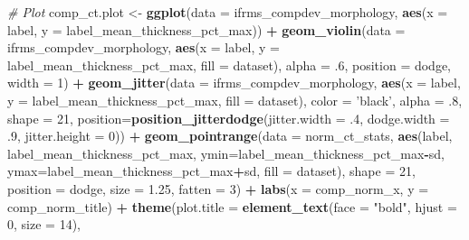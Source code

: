 \documentclass[
]{article}
\newenvironment{Shaded}{\begin{snugshade}}{\end{snugshade}}
\newcommand{\CommentTok}[1]{\textcolor[rgb]{0.56,0.35,0.01}{\textit{#1}}}
\newcommand{\DataTypeTok}[1]{\textcolor[rgb]{0.13,0.29,0.53}{#1}}
\newcommand{\DecValTok}[1]{\textcolor[rgb]{0.00,0.00,0.81}{#1}}
\newcommand{\FloatTok}[1]{\textcolor[rgb]{0.00,0.00,0.81}{#1}}
\newcommand{\KeywordTok}[1]{\textcolor[rgb]{0.13,0.29,0.53}{\textbf{#1}}}
\newcommand{\NormalTok}[1]{#1}
\newcommand{\OperatorTok}[1]{\textcolor[rgb]{0.81,0.36,0.00}{\textbf{#1}}}
\newcommand{\StringTok}[1]{\textcolor[rgb]{0.31,0.60,0.02}{#1}}
\begin{document}
\begin{Shaded}
\begin{Highlighting}[]
{\CommentTok{# Plot}
\NormalTok{comp_ct.plot <-}\StringTok{ }\KeywordTok{ggplot}\NormalTok{(}\DataTypeTok{data =}\NormalTok{ ifrms_compdev_morphology, }\KeywordTok{aes}\NormalTok{(}\DataTypeTok{x =}\NormalTok{ label, }\DataTypeTok{y =}\NormalTok{ label_mean_thickness_pct_max)) }\OperatorTok{+}
\StringTok{  }\KeywordTok{geom_violin}\NormalTok{(}\DataTypeTok{data =}\NormalTok{ ifrms_compdev_morphology, }
              \KeywordTok{aes}\NormalTok{(}\DataTypeTok{x =}\NormalTok{ label, }\DataTypeTok{y =}\NormalTok{ label_mean_thickness_pct_max, }\DataTypeTok{fill =}\NormalTok{ dataset), }
              \DataTypeTok{alpha =} \FloatTok{.6}\NormalTok{, }\DataTypeTok{position =}\NormalTok{ dodge, }\DataTypeTok{width =} \DecValTok{1}\NormalTok{) }\OperatorTok{+}\StringTok{ }
\StringTok{  }\KeywordTok{geom_jitter}\NormalTok{(}\DataTypeTok{data =}\NormalTok{ ifrms_compdev_morphology, }
              \KeywordTok{aes}\NormalTok{(}\DataTypeTok{x =}\NormalTok{ label, }\DataTypeTok{y =}\NormalTok{ label_mean_thickness_pct_max, }\DataTypeTok{fill =}\NormalTok{ dataset), }
              \DataTypeTok{color =} \StringTok{'black'}\NormalTok{, }\DataTypeTok{alpha =} \FloatTok{.8}\NormalTok{, }\DataTypeTok{shape =} \DecValTok{21}\NormalTok{,}
              \DataTypeTok{position=}\KeywordTok{position_jitterdodge}\NormalTok{(}\DataTypeTok{jitter.width =} \FloatTok{.4}\NormalTok{, }\DataTypeTok{dodge.width =} \FloatTok{.9}\NormalTok{, }\DataTypeTok{jitter.height =} \DecValTok{0}\NormalTok{)) }\OperatorTok{+}
\StringTok{  }\KeywordTok{geom_pointrange}\NormalTok{(}\DataTypeTok{data =}\NormalTok{ norm_ct_stats, }
                  \KeywordTok{aes}\NormalTok{(label, label_mean_thickness_pct_max, }
                      \DataTypeTok{ymin=}\NormalTok{label_mean_thickness_pct_max}\OperatorTok{-}\NormalTok{sd, }
                      \DataTypeTok{ymax=}\NormalTok{label_mean_thickness_pct_max}\OperatorTok{+}\NormalTok{sd, }\DataTypeTok{fill =}\NormalTok{ dataset), }
                  \DataTypeTok{shape =} \DecValTok{21}\NormalTok{, }\DataTypeTok{position =}\NormalTok{ dodge, }\DataTypeTok{size =} \FloatTok{1.25}\NormalTok{, }\DataTypeTok{fatten =} \DecValTok{3}\NormalTok{) }\OperatorTok{+}
\StringTok{  }\KeywordTok{labs}\NormalTok{(}\DataTypeTok{x =}\NormalTok{ comp_norm_x,}
       \DataTypeTok{y =}\NormalTok{ comp_norm_title) }\OperatorTok{+}\StringTok{ }
\StringTok{  }\KeywordTok{theme}\NormalTok{(}\DataTypeTok{plot.title =} \KeywordTok{element_text}\NormalTok{(}\DataTypeTok{face =} \StringTok{"bold"}\NormalTok{, }\DataTypeTok{hjust =} \DecValTok{0}\NormalTok{, }\DataTypeTok{size =} \DecValTok{14}\NormalTok{), }
}
\end{Highlighting}
\end{Shaded}
\end{document}
